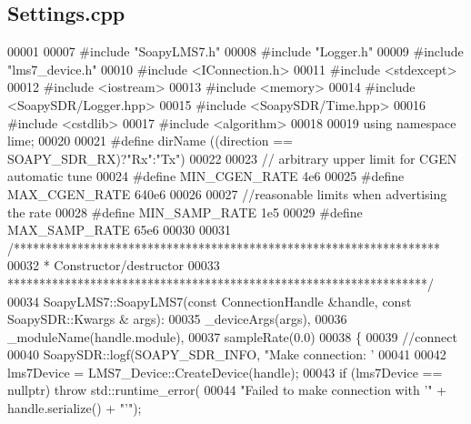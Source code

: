 \subsection{Settings.\+cpp}
\label{Settings_8cpp_source}

\begin{DoxyCode}
00001 
00007 \textcolor{preprocessor}{#include "SoapyLMS7.h"}
00008 \textcolor{preprocessor}{#include "Logger.h"}
00009 \textcolor{preprocessor}{#include "lms7_device.h"}
00010 \textcolor{preprocessor}{#include <IConnection.h>}
00011 \textcolor{preprocessor}{#include <stdexcept>}
00012 \textcolor{preprocessor}{#include <iostream>}
00013 \textcolor{preprocessor}{#include <memory>}
00014 \textcolor{preprocessor}{#include <SoapySDR/Logger.hpp>}
00015 \textcolor{preprocessor}{#include <SoapySDR/Time.hpp>}
00016 \textcolor{preprocessor}{#include <cstdlib>}
00017 \textcolor{preprocessor}{#include <algorithm>}
00018 
00019 \textcolor{keyword}{using namespace }lime;
00020 
00021 \textcolor{preprocessor}{#define dirName ((direction == SOAPY\_SDR\_RX)?"Rx":"Tx")}
00022 
00023 \textcolor{comment}{// arbitrary upper limit for CGEN automatic tune}
00024 \textcolor{preprocessor}{#define MIN\_CGEN\_RATE 4e6}
00025 \textcolor{preprocessor}{#define MAX\_CGEN\_RATE 640e6}
00026 
00027 \textcolor{comment}{//reasonable limits when advertising the rate}
00028 \textcolor{preprocessor}{#define MIN\_SAMP\_RATE 1e5}
00029 \textcolor{preprocessor}{#define MAX\_SAMP\_RATE 65e6}
00030 
00031 \textcolor{comment}{/*******************************************************************}
00032 \textcolor{comment}{ * Constructor/destructor}
00033 \textcolor{comment}{ ******************************************************************/}
00034 SoapyLMS7::SoapyLMS7(\textcolor{keyword}{const} ConnectionHandle &handle, \textcolor{keyword}{const} SoapySDR::Kwargs &
      args):
00035     \_deviceArgs(args),
00036     \_moduleName(handle.module),
00037     sampleRate(0.0)
00038 \{
00039     \textcolor{comment}{//connect}
00040     SoapySDR::logf(SOAPY_SDR_INFO, \textcolor{stringliteral}{"Make connection: '%
00041 
00042     lms7Device = LMS7\_Device::CreateDevice(handle);
00043     \textcolor{keywordflow}{if} (lms7Device == \textcolor{keyword}{nullptr}) \textcolor{keywordflow}{throw} std::runtime\_error(
00044         \textcolor{stringliteral}{"Failed to make connection with '"} + handle.serialize() + \textcolor{stringliteral}{"'"});
}
\end{DoxyCode}
